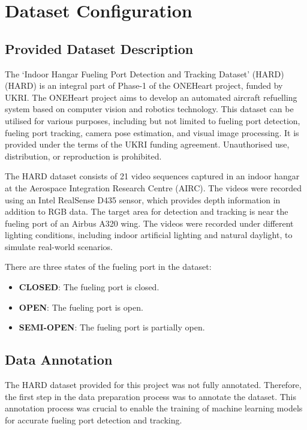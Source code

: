 \documentclass[12pt,oneside]{book} %
\begin{document}
\section{Dataset Configuration}
\subsection{Provided Dataset Description}
The `Indoor Hangar Fueling Port Detection and Tracking Dataset' (HARD) (HARD)
is an integral part of Phase-1 of the ONEHeart project, funded by UKRI. The
ONEHeart project aims to develop an automated aircraft refuelling system based
on computer vision and robotics technology. This dataset can be utilised for
various purposes, including but not limited to fueling port detection, fueling
port tracking, camera pose estimation, and visual image processing. It is
provided under the terms of the UKRI funding agreement. Unauthorised use,
distribution, or reproduction is prohibited.

The HARD dataset consists of 21 video sequences captured in an indoor hangar at
the Aerospace Integration Research Centre (AIRC). The videos were recorded
using an Intel RealSense D435 sensor, which provides depth information in
addition to RGB data. The target area for detection and tracking is near the
fueling port of an Airbus A320 wing. The videos were recorded under different
lighting conditions, including indoor artificial lighting and natural daylight,
to simulate real-world scenarios.

There are three states of the fueling port in the dataset:
\begin{itemize}
    \item \textbf{CLOSED}: The fueling port is closed.
    \item \textbf{OPEN}: The fueling port is open.
    \item \textbf{SEMI-OPEN}: The fueling port is partially open.
\end{itemize}

\subsection{Data Annotation}
The HARD dataset provided for this project was not fully annotated. Therefore,
the first step in the data preparation process was to annotate the dataset.
This annotation process was crucial to enable the training of machine learning
models for accurate fueling port detection and tracking.
\end{document}
